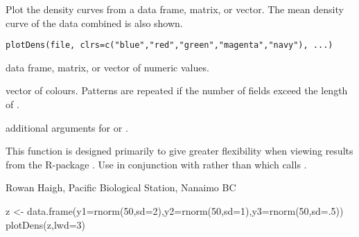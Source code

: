 \documentclass[letterpaper]{book}
\begin{document}
\begin{Description}\relax
Plot the density curves from a data frame, matrix, or vector. 
The mean density curve of the data combined is also shown.
\end{Description}
\begin{Usage}
\begin{verbatim}
plotDens(file, clrs=c("blue","red","green","magenta","navy"), ...)  
\end{verbatim}
\end{Usage}
\begin{Arguments}
\begin{ldescription}
\item[\code{file}] data frame, matrix, or vector of numeric values.
\item[\code{clrs}] vector of colours. Patterns are repeated if the number 
of fields exceed the length of .
\item[\code{...}] additional arguments for  or .
\end{ldescription}
\end{Arguments}
\begin{Details}\relax
This function is designed primarily to give greater flexibility when viewing 
results from the R-package . Use  in conjunction with 
 rather than  
which calls .
\end{Details}
\begin{Author}\relax
Rowan Haigh, Pacific Biological Station, Nanaimo BC
\end{Author}
\begin{Examples}
\begin{ExampleCode}
z <- data.frame(y1=rnorm(50,sd=2),y2=rnorm(50,sd=1),y3=rnorm(50,sd=.5))
plotDens(z,lwd=3)
\end{ExampleCode}
\end{Examples}
\end{document}
